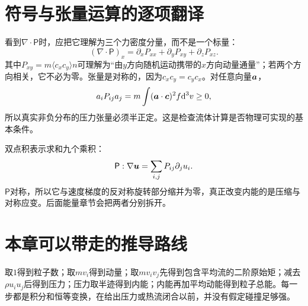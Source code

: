 \section{符号与张量运算的逐项翻译}
看到$\nabla\cdot\mathsf P$时，应把它理解为三个力密度分量，而不是一个标量：
\begin{equation}
(\nabla\cdot\mathsf P)_x=\partial_xP_{xx}+\partial_yP_{xy}+\partial_zP_{xz}.
\end{equation}
其中$P_{xy}=m\langle c_xc_y\rangle n$可理解为“由$y$方向随机运动携带的$x$方向动量通量”；若两个方向相关，它不必为零。张量是对称的，因为$c_xc_y=c_yc_x$。对任意向量$\bm{a}$，
\begin{equation}
a_iP_{ij}a_j=m\int(\bm{a}\cdot\bm{c})^2f\mathrm d^3v\geq0,
\end{equation}
所以真实非负分布的压力张量必须半正定。这是检查流体计算是否物理可实现的基本条件。

双点积表示求和九个乘积：
\begin{equation}
\mathsf P:\nabla\bm{u}=\sum_{i,j}P_{ij}\partial_ju_i.
\end{equation}
$\mathsf P$对称，所以它与速度梯度的反对称旋转部分缩并为零，真正改变内能的是压缩与对称应变。后面能量章节会把两者分别拆开。

\section{本章可以带走的推导路线}
取$1$得到粒子数；取$mv_i$得到动量；取$mv_iv_j$先得到包含平均流的二阶原始矩；减去$\rho u_iu_j$后得到压力；压力取半迹得到内能；内能再加平均动能得到粒子总能。每一步都是积分和恒等变换，在给出压力或热流闭合以前，并没有假定碰撞足够强。


